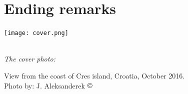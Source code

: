 \documentclass[12pt]{report}
\begin{document}
\chapter*{Ending remarks}



\begin{flushright}


\texttt{[image: cover.png]}

\setlength{\parskip}{0.1em}
\setlength{\parindent}{0cm}
\ \\[0.5cm]
\textit{The cover photo:}  

View from the coast of Cres island, Croatia, October 2016.
\ \\[0.1cm]
Photo by: J. Aleksanderek $\copyright$
\end{flushright}





\end{document}
